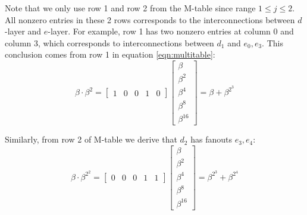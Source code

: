 \begin{Example}
\begin{figure}[H]
\end{figure}

Note that we only use row 1 and row 2 from the M-table since range $1\leq j \leq 2$.
All nonzero entries in these 2 rows corresponds to the interconnections between $d$-layer and 
$e$-layer. For example, row 1 has two nonzero entries at column 0 and column 3, which corresponds to interconnections 
between $d_1$ and $e_0,e_3$. This conclusion comes from row 1 in equation \ref{eqn:multitable}:
\begin{equation*}
\beta\cdot\beta^2 = 
\begin{bmatrix}
1 & 0 & 0 & 1 & 0
\end{bmatrix}
\begin{bmatrix}
\beta \\ \beta^2 \\ \beta^4 \\ \beta^8 \\ \beta^{16}
\end{bmatrix}
= \beta + \beta^{2^3}
\end{equation*}

Similarly, from row 2 of M-table we derive that $d_2$ has fanouts $e_3,e_4$:
\begin{equation*}
\beta\cdot\beta^{2^2} = 
\begin{bmatrix}
0 & 0 & 0 & 1 & 1
\end{bmatrix}
\begin{bmatrix}
\beta \\ \beta^2 \\ \beta^4 \\ \beta^8 \\ \beta^{16}
\end{bmatrix}
= \beta^{2^3} + \beta^{2^4}
\end{equation*}


\end{Example}

